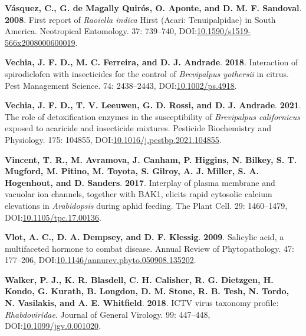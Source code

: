 \documentclass[12pt,final,CPage]{ufthesis}
\newlength{\cslhangindent}
\newenvironment{CSLReferences}[2] %
{%
	\setlength{\parindent}{0pt}
	\ifodd #1 \everypar{\setlength{\hangindent}{\cslhangindent}}\ignorespaces\fi
	\ifnum #2 > 0
	\setlength{\parskip}{#2\baselineskip}
	\fi
}%
{}
\begin{document}
{\begin{CSLReferences}{1}{0}
  \leavevmode{}%
  \textbf{Vásquez, C., G. de Magally Quirós, O. Aponte, and D. M. F. Sandoval}. \textbf{2008}. First report of {\emph{Raoiella indica}} {Hirst} ({Acari}: {Tenuipalpidae}) in {South} {America}. Neotropical Entomology. 37: 739--740, DOI:\href{https://doi.org/10.1590/s1519-566x2008000600019}{10.1590/s1519-566x2008000600019}.

  \leavevmode{}%
  \textbf{Vechia, J. F. D., M. C. Ferreira, and D. J. Andrade}. \textbf{2018}. Interaction of spirodiclofen with insecticides for the control of {\emph{Brevipalpus yothersii}} in citrus. Pest Management Science. 74: 2438--2443, DOI:\href{https://doi.org/10.1002/ps.4918}{10.1002/ps.4918}.

  \leavevmode{}%
  \textbf{Vechia, J. F. D., T. V. Leeuwen, G. D. Rossi, and D. J. Andrade}. \textbf{2021}. The role of detoxification enzymes in the susceptibility of {\emph{Brevipalpus californicus}} exposed to acaricide and insecticide mixtures. Pesticide Biochemistry and Physiology. 175: 104855, DOI:\href{https://doi.org/10.1016/j.pestbp.2021.104855}{10.1016/j.pestbp.2021.104855}.

  \leavevmode{}%
  \textbf{Vincent, T. R., M. Avramova, J. Canham, P. Higgins, N. Bilkey, S. T. Mugford, M. Pitino, M. Toyota, S. Gilroy, A. J. Miller, S. A. Hogenhout, and D. Sanders}. \textbf{2017}. Interplay of plasma membrane and vacuolar ion channels, together with {BAK}1, elicits rapid cytosolic calcium elevations in {\emph{Arabidopsis}} during aphid feeding. The Plant Cell. 29: 1460--1479, DOI:\href{https://doi.org/10.1105/tpc.17.00136}{10.1105/tpc.17.00136}.

  \leavevmode{}%
  \textbf{Vlot, A. C., D. A. Dempsey, and D. F. Klessig}. \textbf{2009}. Salicylic acid, a multifaceted hormone to combat disease. Annual Review of Phytopathology. 47: 177--206, DOI:\href{https://doi.org/10.1146/annurev.phyto.050908.135202}{10.1146/annurev.phyto.050908.135202}.

  \leavevmode{}%
  \textbf{Walker, P. J., K. R. Blasdell, C. H. Calisher, R. G. Dietzgen, H. Kondo, G. Kurath, B. Longdon, D. M. Stone, R. B. Tesh, N. Tordo, N. Vasilakis, and A. E. Whitfield}. \textbf{2018}. {ICTV} virus taxonomy profile: {\emph{Rhabdoviridae}}. Journal of General Virology. 99: 447--448, DOI:\href{https://doi.org/10.1099/jgv.0.001020}{10.1099/jgv.0.001020}.


\end{CSLReferences}}
\end{document}

